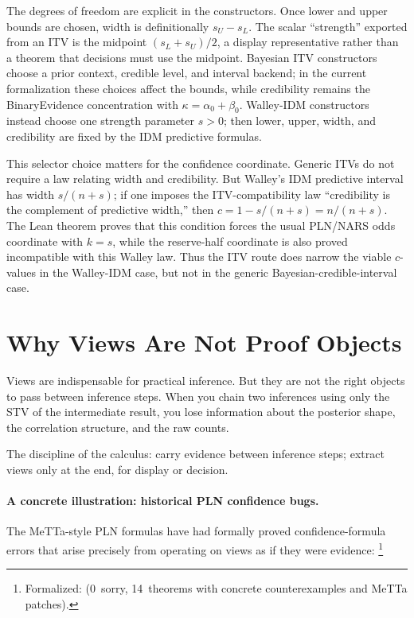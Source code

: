 \documentclass[11pt,openany]{report}
\begin{document}
The degrees of freedom are explicit in the constructors.  Once lower and
upper bounds are chosen, width is definitionally $s_U-s_L$.  The scalar
``strength'' exported from an ITV is the midpoint $(s_L+s_U)/2$, a
display representative rather than a theorem that decisions must use the
midpoint.  Bayesian ITV constructors choose a prior context, credible
level, and interval backend; in the current formalization these choices
affect the bounds, while credibility remains the BinaryEvidence
concentration with $\kappa=\alpha_0+\beta_0$.  Walley-IDM constructors
instead choose one strength parameter $s>0$; then lower, upper, width,
and credibility are fixed by the IDM predictive formulas.

This selector choice matters for the confidence coordinate.  Generic
ITVs do not require a law relating width and credibility.  But Walley's
IDM predictive interval has width $s/(n+s)$; if one imposes the
ITV-compatibility law ``credibility is the complement of predictive
width,'' then $c = 1 - s/(n+s) = n/(n+s)$.  The Lean theorem
 proves that this
condition forces the usual PLN/NARS odds coordinate with $k=s$, while the
reserve-half coordinate is also proved incompatible with this Walley law.
Thus the ITV route does narrow the viable $c$-values in the Walley-IDM
case, but not in the generic Bayesian-credible-interval case.


\section{Why Views Are Not Proof Objects}
\label{sec:views-not-proof}

Views are indispensable for practical inference.  But they are not
the right objects to pass between inference steps.  When you chain
two inferences using only the STV of the intermediate result, you
lose information about the posterior shape, the correlation structure,
and the raw counts.

The discipline of the calculus: carry evidence between inference
steps; extract views only at the end, for display or decision.

\paragraph{A concrete illustration: historical PLN confidence bugs.}
The MeTTa-style PLN formulas have had formally proved
confidence-formula errors that arise precisely from operating on views
as if they were evidence:%
\footnote{Formalized:
(0~sorry, 14~theorems with concrete counterexamples and MeTTa
patches).}
\end{document}
